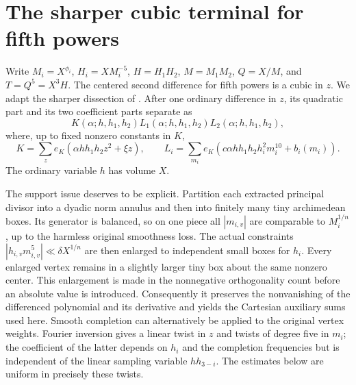 \documentclass[11pt,reqno]{amsart}
\numberwithin{equation}{section}
\theoremstyle{definition}
\begin{document}
\section{The sharper cubic terminal for fifth powers}
\label{sec:k5-terminal}

Write $M_i=X^{\phi_i}$, $H_i=XM_i^{-5}$, $H=H_1H_2$,
$M=M_1M_2$, $Q=X/M$, and $T=Q^5=X^3H$.
The centered second difference for fifth powers is a cubic in $z$.
We adapt the sharper dissection of \cite[Lemma~6.1]{VW1995}.
After one ordinary difference in $z$, its quadratic part and its two
coefficient parts separate as
\[
 K(\alpha;h,h_1,h_2)
 L_1(\alpha;h,h_1,h_2)L_2(\alpha;h,h_1,h_2),
\]
where, up to fixed nonzero constants in $K$,
\[
 K=\sum_z e_K(\alpha hh_1h_2 z^2+\xi z),\qquad
 L_i=\sum_{m_i}e_K(c\alpha hh_1h_2h_i^2m_i^{10}+b_i(m_i)).
\]
The ordinary variable $h$ has volume $X$.

The support issue deserves to be explicit.  Partition each extracted
principal divisor into a dyadic norm annulus and then into finitely many
tiny archimedean boxes.  Its generator is balanced, so on one piece all
$|m_{i,v}|$ are comparable to $M_i^{1/n}$, up to the harmless original
smoothness loss.  The actual constraints
$|h_{i,v}m_{i,v}^5|\ll\delta X^{1/n}$ are then enlarged to independent
small boxes for $h_i$.  Every enlarged vertex remains in a slightly larger
tiny box about the same nonzero center.  This enlargement is made in the
nonnegative orthogonality count before an absolute value is introduced.
Consequently it preserves the nonvanishing of the differenced polynomial
and its derivative and yields the Cartesian auxiliary sums used here.
Smooth completion can alternatively be applied to the original vertex
weights.  Fourier inversion gives a linear twist in $z$ and twists of
degree five in $m_i$; the coefficient of the latter depends on $h_i$ and the
completion frequencies but is independent of the linear sampling variable
$hh_{3-i}$.  The estimates below are uniform in precisely these twists.
\end{document}
